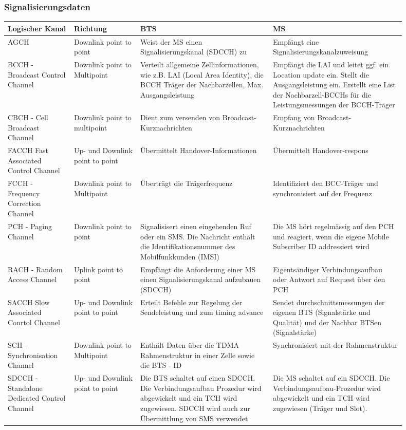 \subsubsection{Signalisierungsdaten}
\begin{tabular}{p{0.15 \linewidth} p{0.15 \linewidth} p{0.3 \linewidth} p{0.3 \linewidth}}
\toprule
Logischer Kanal & Richtung & BTS & MS \\
\midrule
AGCH & Downlink point to point & Weist der MS einen Signalisierungskanal (SDCCH) zu & Empfängt eine Signalisierungskanalzuweisung \\
\midrule
BCCH - Broadcast Control Channel & Downlink point to Multipoint & Verteilt allgemeine Zellinformationen, wie z.B. LAI (Local Area Identity), die BCCH Träger der Nachbarzellen, Max. Ausgangsleistung & Empfängt die LAI und leitet  ggf. ein Location update ein. 
Stellt die Ausgangsleistung ein.
 Erstellt eine List der Nachbarzell-BCCHs für die Leistungsmessungen der BCCH-Träger \\
\midrule
CBCH - Cell Broadcast Channel & Downlink point to multipoint & Dient zum versenden von Broadcast-Kurznachrichten & Empfang von Broadcast-Kurznachrichten\\
\midrule
FACCH Fast Associated Control Channel & Up- und Downlink point to point & Übermittelt Handover-Informationen & Übermittelt Handover-respons\\
\midrule
FCCH - Frequency Correction Channel & Downlink point to Multipoint & Überträgt die Trägerfrequenz & Identifiziert den BCC-Träger und synchronisiert auf der Frequenz \\
\midrule
PCH - Paging Channel & Downlink point to point & Signalisisert einen eingehenden Ruf oder ein SMS. Die Nachricht enthält die Identifikationsnummer des Mobilfunkkunden (IMSI) & Die MS hört regelmässig auf den PCH und reagiert, wenn die eigene Mobile Subscriber ID addressiert wird \\
\midrule
RACH - Random Access Channel & Uplink point to point & Empfängt die Anforderung einer MS einen Signalisierungskanal aufzubauen (SDCCH) & Eigentsändiger Verbindungsaufbau oder Antwort auf Request über den PCH \\
\midrule
SACCH Slow Associated Conrtol Channel & Up- und Downlink point to point & Erteilt Befehle zur Regelung der Sendeleistung und zum timing advance & Sendet durchschnittsmessungen der eigenen BTS (Signalstärke und Qualität) und der Nachbar BTSen (Signalstärke) \\
\midrule
SCH - Synchronisation Channel & Downlink point to Multipoint & Enthält Daten über die TDMA Rahmenstruktur in einer Zelle sowie die BTS - ID & Synchronisiert mit der Rahmenstruktur \\
\midrule
SDCCH - Standalone Dedicated Control Channel & Up- und Downlink point to point & Die BTS schaltet auf einen SDCCH.
Die Verbindungsaufbau Prozedur wird abgewickelt und ein TCH wird zugewiesen.
SDCCH wird auch zur Übermittlung von SMS verwendet & Die MS schaltet auf ein SDCCH.
Die Verbindungsaufbau-Prozedur wird abgewickelt und ein TCH wird zugewiesen (Träger und Slot).\\
\bottomrule

\end{tabular}

